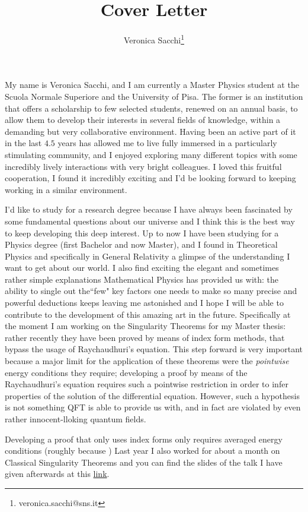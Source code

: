 \documentclass[12pt, a4paper]{article}
\title{Cover Letter}
\author{Veronica Sacchi\thanks{veronica.sacchi@sns.it}}
\begin{document}
\maketitle

My name is Veronica Sacchi, and I am currently a Master Physics student at the Scuola Normale Superiore and the University of Pisa. The former is an institution that offers a scholarship to few selected students, renewed on an annual basis, to allow them to develop their interests in several fields of knowledge, within a demanding but very collaborative environment.
Having been an active part of it in the last \(4.5\) years has allowed me to live fully immersed in a particularly stimulating community, and I enjoyed exploring many different topics with some incredibly lively interactions with very bright colleagues. I loved this fruitful cooperation, I found it incredibly exciting and I'd be looking forward to keeping working in a similar environment.

I'd like to study for a research degree because I have always been fascinated by some fundamental questions about our universe and I think this is the best way to keep developing this deep interest.
Up to now I have been studying for a Physics degree (first Bachelor and now Master), and I found in Theoretical Physics and specifically in General Relativity a glimpse of the understanding I want to get about our world. 
I also find exciting the elegant and sometimes rather simple explanations Mathematical Physics has provided us with: the ability to single out the``few" key factors one needs to make so many precise and powerful deductions keeps leaving me astonished and I hope I will be able to contribute to the development of this amazing art in the future.
Specifically at the moment I am working on the Singularity Theorems for my Master thesis: rather recently they have been proved by means of index form methods, that bypass the usage of Raychaudhuri's equation. This step forward is very important because a major limit for the application of these theorems were the \emph{pointwise} energy conditions they require; developing a proof by means of the Raychaudhuri's equation requires such a pointwise restriction in order to infer properties of the solution of the differential equation. However, such a hypothesis is not something QFT is able to provide us with, and in fact are violated by even rather innocent-lloking quantum fields.

Developing a proof that only uses index forms only requires averaged energy conditions (roughly because )
Last year I also worked for about a month on Classical Singularity Theorems and you can find the slides of the talk I have given afterwards at this \href{https://uz.sns.it/~ver22albireo/ext-file/colloquio/slides.pdf}{link}.
\end{document}
